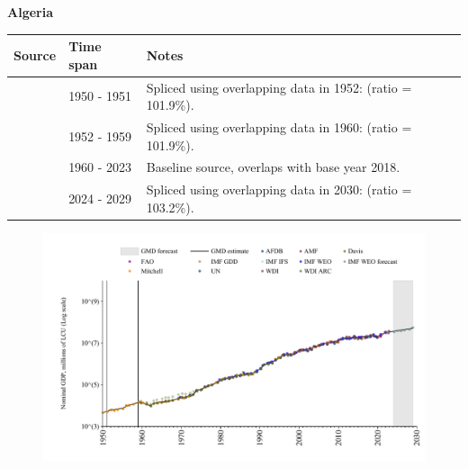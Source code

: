 \documentclass[12pt,a4paper,landscape]{article}
\begin{document}
\begin{adjustbox}{max totalsize={\paperwidth}{\paperheight},center}
\begin{minipage}[t][\textheight][t]{\textwidth}
\vspace*{0.5cm}
{}
\begin{center}
{\Large\bfseries Algeria}
\end{center}
\vspace{0.5cm}
\begin{table}[H]
\centering
\small
\begin{tabular}{|l|l|l|}
\hline
\textbf{Source} & \textbf{Time span} & \textbf{Notes} \\
\hline
\rowcolor{white}\cite{IMF_IFS}& 1950 - 1951 &Spliced using overlapping data in 1952: (ratio = 101.9\%).\\
\rowcolor{lightgray}\cite{Mitchell}& 1952 - 1959 &Spliced using overlapping data in 1960: (ratio = 101.9\%).\\
\rowcolor{white}\cite{WDI}& 1960 - 2023 &Baseline source, overlaps with base year 2018.\\
\rowcolor{lightgray}\cite{IMF_WEO_forecast}& 2024 - 2029 &Spliced using overlapping data in 2030: (ratio = 103.2\%).\\
\hline
\end{tabular}
\end{table}
\begin{figure}[H]
\centering
\includegraphics[width=\textwidth,height=0.6\textheight,keepaspectratio]{graphs/DZA_nGDP.pdf}
\end{figure}
\end{minipage}
\end{adjustbox}
\end{document}
